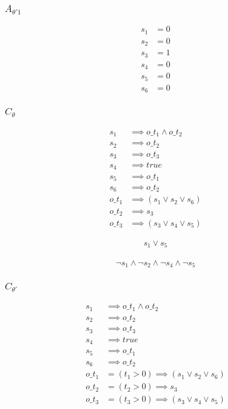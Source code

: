 \documentclass{scrartcl}
\begin{document}
\subsubsection{$A_{\theta'1}$}
\begin{align*}
  s_1 &= 0 \\
  s_2 &= 0 \\
  s_3 &= 1 \\
  s_4 &= 0 \\
  s_5 &= 0 \\
  s_6 &= 0
\end{align*}

\subsubsection{$C_\theta$}

\begin{align*}
  s_1 &\implies o\_t_1 \land o\_t_2 \\
  s_2 &\implies o\_t_2 \\
  s_3 &\implies o\_t_3 \\
  s_4 &\implies true \\
  s_5 &\implies o\_t_1 \\
  s_6 &\implies o\_t_2 \\
  o\_t_1 &\implies (s_1 \lor s_2 \lor s_6) \\
  o\_t_2 &\implies s_3 \\
  o\_t_3 &\implies (s_3 \lor s_4 \lor s_5)
\end{align*}

\begin{align*}
  s_1 \lor s_5
\end{align*}

\begin{align*}
  \neg s_1 \land \neg s_2 \land \neg s_4 \land \neg s_5
\end{align*}

\subsubsection{$C_{\theta'}$}

\begin{align*}
  s_1 &\implies o\_t_1 \land o\_t_2 \\
  s_2 &\implies o\_t_2 \\
  s_3 &\implies o\_t_3 \\
  s_4 &\implies true \\
  s_5 &\implies o\_t_1 \\
  s_6 &\implies o\_t_2 \\
  o\_t_1 &= (t_1 > 0) \implies (s_1 \lor s_2 \lor s_6) \\
  o\_t_2 &= (t_2 > 0) \implies s_3 \\
  o\_t_3 &= (t_3 > 0) \implies (s_3 \lor s_4 \lor s_5)
\end{align*}
\end{document}

